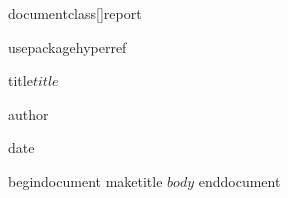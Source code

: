documentclass[]{report} %
  
  usepackage{hyperref}    %
  
  title{$title$}          %
  
  author{}                %
    
  date{}                  %
  
  begin{document}
  maketitle
    $body$
      end{document}